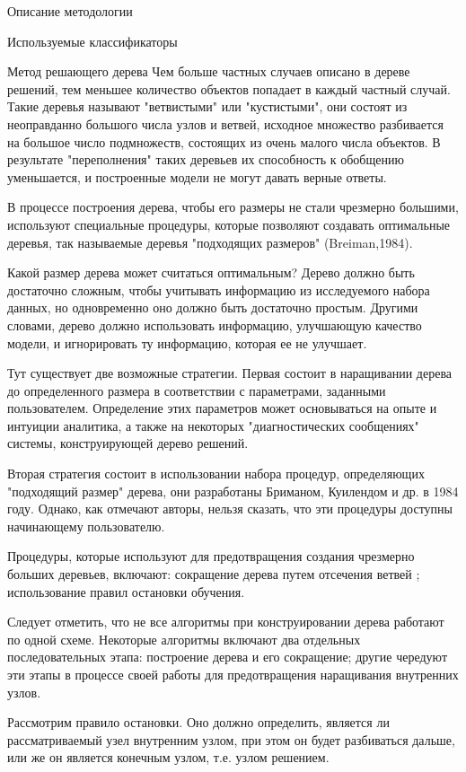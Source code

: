 \begin{section}{Описание методологии}
\begin{subsection}{Используемые классификаторы}
\begin{subsubsection}{Метод решающего дерева}
Чем больше частных случаев описано в дереве решений, тем меньшее количество объектов попадает в каждый частный случай. Такие деревья называют "ветвистыми" или "кустистыми", они состоят из неоправданно большого числа узлов и ветвей, исходное множество разбивается на большое число подмножеств, состоящих из очень малого числа объектов. В результате "переполнения" таких деревьев их способность к обобщению уменьшается, и построенные модели не могут давать верные ответы.

В процессе построения дерева, чтобы его размеры не стали чрезмерно большими, используют специальные процедуры, которые позволяют создавать оптимальные деревья, так называемые деревья "подходящих размеров" (Breiman,1984).

Какой размер дерева может считаться оптимальным? Дерево должно быть достаточно сложным, чтобы учитывать информацию из исследуемого набора данных, но одновременно оно должно быть достаточно простым. Другими словами, дерево должно использовать информацию, улучшающую качество модели, и игнорировать ту информацию, которая ее не улучшает.

Тут существует две возможные стратегии. Первая состоит в наращивании дерева до определенного размера в соответствии с параметрами, заданными пользователем. Определение этих параметров может основываться на опыте и интуиции аналитика, а также на некоторых "диагностических сообщениях" системы, конструирующей дерево решений.

Вторая стратегия состоит в использовании набора процедур, определяющих "подходящий размер" дерева, они разработаны Бриманом, Куилендом и др. в 1984 году. Однако, как отмечают авторы, нельзя сказать, что эти процедуры доступны начинающему пользователю.

Процедуры, которые используют для предотвращения создания чрезмерно больших деревьев, включают: сокращение дерева путем отсечения ветвей ; использование правил остановки обучения.

Следует отметить, что не все алгоритмы при конструировании дерева работают по одной схеме. Некоторые алгоритмы включают два отдельных последовательных этапа: построение дерева и его сокращение; другие чередуют эти этапы в процессе своей работы для предотвращения наращивания внутренних узлов.

Рассмотрим правило остановки. Оно должно определить, является ли рассматриваемый узел внутренним узлом, при этом он будет разбиваться дальше, или же он является конечным узлом, т.е. узлом решением.


\end{subsubsection}
\end{subsection}
\end{section}
